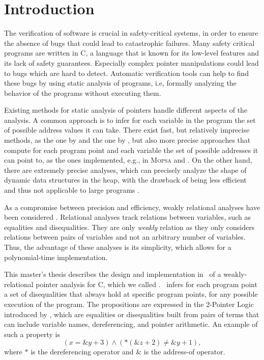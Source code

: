 
\chapter{Introduction}\label{chapter:introduction}

The verification of software is crucial in safety-critical systems, in order to ensure the absence of bugs that could lead to catastrophic failures.
Many safety critical programs are written in C, a language that is known for its low-level features and its lack of safety guarantees.
Especially complex pointer manipulations could lead to bugs which are hard to detect.
Automatic verification tools can help to find these bugs by using static analysis of programs,
i.e, formally analyzing the behavior of the programs without executing them.

Existing methods for static analysis of pointers handle different aspects of the analysis.
A common approach is to infer for each variable in the program the set of possible address values it can take.
There exist fast, but relatively imprecise methods, as the one by \textcite{Steensgaard} and the one by \textcite{Andersen}, but also more precise approaches that compute for each program point and each variable the set of possible addresses it can point to, as the ones implemented, e.g., in \textsc{Mopsa} \cite{mopsa} and \goblint \cite{goblint}.
On the other hand, there are extremely precise analyses, which can precisely analyze the shape of dynamic data structures in the heap,
with the drawback of being less efficient and thus not applicable to large programs
\cite{rivalpapers,kreiker,predator}.

As a compromise between precision and efficiency,
weakly relational analyses have been considered \cite{octagon,SeidlETS2023}.
Relational analyses track relations between variables, such as equalities and disequalities.
They are only \emph{weakly} relation as they only considers relations between pairs of variables and not an arbitrary number of variables.
Thus, the advantage of these analyses is its simplicity, which allows for a polynomial-time implementation.

This master's thesis describes the design and implementation in \goblint\ of a weakly-relational pointer analysis for C,
which we called \cpo.
\cpo\ infers for each program point a set of disequalities that always hold at specific program points,
for any possible execution of the program.
The propositions are expressed in the 2-Pointer Logic introduced by \textcite{2pointer}, which
are equalities or disequalities built from pairs of terms that can
include variable names, dereferencing, and pointer arithmetic.
An example of such a property is 
\begin{equation}\label{example:introduction}
    (x = \&y + 3) \land (*(\&z + 2) \neq \&y + 1),
\end{equation}
where $*$ is the dereferencing operator and $\&$ is the address-of operator.

